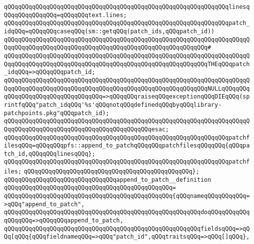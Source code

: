 \verb|qQQqqQQqqQQqqQQqqQQqqQQqqQQqqQQqqQQqqQQqqQQqqQQqqQQqqQQqqQQqqQQqlinesqQQqqQQqqQQqqQQq=qQQqqQQqtext.lines;|\newline
\newline
\verb|qQQqqQQqqQQqqQQqqQQqqQQqqQQqqQQqqQQqqQQqqQQqqQQqqQQqqQQqqQQqqQQqpatch_idqQQq=qQQqqQQqcaseqQQq(sm::getqQQq(patch_ids,qQQqpatch_id))|\newline
\verb|qQQqqQQqqQQqqQQqqQQqqQQqqQQqqQQqqQQqqQQqqQQqqQQqqQQqqQQqqQQqqQQqqQQqqQQqqQQqqQQqqQQqqQQqqQQqqQQqqQQqqQQqqQQqqQQqqQQqqQQqqQQqqQQq#|\newline
\verb|qQQqqQQqqQQqqQQqqQQqqQQqqQQqqQQqqQQqqQQqqQQqqQQqqQQqqQQqqQQqqQQqqQQqqQQqqQQqqQQqqQQqqQQqqQQqqQQqqQQqqQQqqQQqqQQqqQQqqQQqqQQqqQQqTHEqQQqpatch_idqQQq=>qQQqqQQqpatch_id;|\newline
\verb|qQQqqQQqqQQqqQQqqQQqqQQqqQQqqQQqqQQqqQQqqQQqqQQqqQQqqQQqqQQqqQQqqQQqqQQqqQQqqQQqqQQqqQQqqQQqqQQqqQQqqQQqqQQqqQQqqQQqqQQqqQQqqQQqNULLqQQqqQQqqQQqqQQqqQQqqQQqqQQqqQQqqQQq=>qQQqqQQqraiseqQQqexceptionqQQqDIEqQQq(sprintfqQQq"patch_idqQQq'%s'qQQqnotqQQqdefinedqQQqbyqQQqlibrary-patchpoints.pkg"qQQqpatch_id);|\newline
\verb|qQQqqQQqqQQqqQQqqQQqqQQqqQQqqQQqqQQqqQQqqQQqqQQqqQQqqQQqqQQqqQQqqQQqqQQqqQQqqQQqqQQqqQQqqQQqqQQqqQQqqQQqqQQqqQQqesac;|\newline
\newline
\verb|qQQqqQQqqQQqqQQqqQQqqQQqqQQqqQQqqQQqqQQqqQQqqQQqqQQqqQQqqQQqqQQqpatchfilesqQQq=qQQqqQQqpfs::append_to_patchqQQqqQQqpatchfilesqQQqqQQq{qQQqpatch_id,qQQqqQQqlinesqQQq};|\newline
\newline
\verb|qQQqqQQqqQQqqQQqqQQqqQQqqQQqqQQqqQQqqQQqqQQqqQQqqQQqqQQqqQQqqQQqpatchfiles;|\newline
\verb|qQQqqQQqqQQqqQQqqQQqqQQqqQQqqQQqqQQqqQQqqQQqqQQq};|\newline
\newline
\verb|qQQqqQQqqQQqqQQqqQQqqQQqqQQqqQQqappend_to_patch__definition|\newline
\verb|qQQqqQQqqQQqqQQqqQQqqQQqqQQqqQQqqQQqqQQqqQQqqQQq=|\newline
\verb|qQQqqQQqqQQqqQQqqQQqqQQqqQQqqQQqqQQqqQQqqQQqqQQq{qQQqnameqQQqqQQqqQQq=>qQQq"append_to_patch",|\newline
\verb|qQQqqQQqqQQqqQQqqQQqqQQqqQQqqQQqqQQqqQQqqQQqqQQqqQQqqQQqdoqQQqqQQqqQQqqQQqqQQq=>qQQqqQQqappend_to_patch,|\newline
\verb|qQQqqQQqqQQqqQQqqQQqqQQqqQQqqQQqqQQqqQQqqQQqqQQqqQQqqQQqfieldsqQQq=>qQQq[qQQq{qQQqfieldnameqQQq=>qQQq"patch_id",qQQqtraitsqQQq=>qQQq[]qQQq},|\newline
